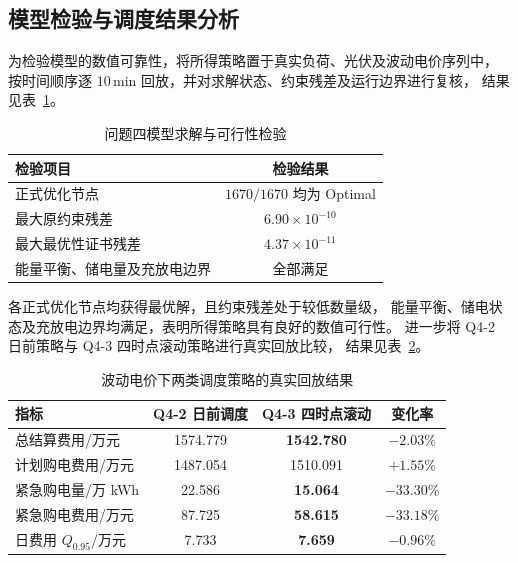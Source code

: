 \documentclass[zihao=-4,a4paper,UTF8,fontset=none]{ctexart}
\begin{document}
\subsection{模型检验与调度结果分析}

为检验模型的数值可靠性，将所得策略置于真实负荷、光伏及波动电价序列中，
按时间顺序逐 $10\,\mathrm{min}$ 回放，并对求解状态、约束残差及运行边界进行复核，
结果见表~\ref{tab:q4_validation}。

\begin{table}[H]
    \centering
    \caption{问题四模型求解与可行性检验}
    \label{tab:q4_validation}
    \small
    \setlength{\tabcolsep}{6pt}
    \begin{tabular}{lc}
        \toprule
        检验项目 & 检验结果 \\
        \midrule
        正式优化节点 & $1670/1670$ 均为 Optimal \\
        最大原约束残差 & $6.90\times10^{-10}$ \\
        最大最优性证书残差 & $4.37\times10^{-11}$ \\
        能量平衡、储电量及充放电边界 & 全部满足 \\
        \bottomrule
    \end{tabular}
\end{table}

各正式优化节点均获得最优解，且约束残差处于较低数量级，
能量平衡、储电状态及充放电边界均满足，表明所得策略具有良好的数值可行性。
进一步将 Q4-2 日前策略与 Q4-3 四时点滚动策略进行真实回放比较，
结果见表~\ref{tab:q4_result}。


\begin{table}[H]
    \centering
    \caption{波动电价下两类调度策略的真实回放结果}
    \label{tab:q4_result}
    \small
    \setlength{\tabcolsep}{5pt}
    \begin{tabular}{lccc}
        \toprule
        指标 & Q4-2 日前调度 & Q4-3 四时点滚动 & 变化率 \\
        \midrule
        总结算费用/万元
        & 1574.779 & \textbf{1542.780} & \textbf{$-2.03\%$} \\

        计划购电费用/万元
        & 1487.054 & 1510.091 & $+1.55\%$ \\

        紧急购电量/万 kWh
        & 22.586 & \textbf{15.064} & \textbf{$-33.30\%$} \\

        紧急购电费用/万元
        & 87.725 & \textbf{58.615} & \textbf{$-33.18\%$} \\

        日费用 $Q_{0.95}$/万元
        & 7.733 & \textbf{7.659} & $-0.96\%$ \\
        \bottomrule
    \end{tabular}
\end{table}
\end{document}

